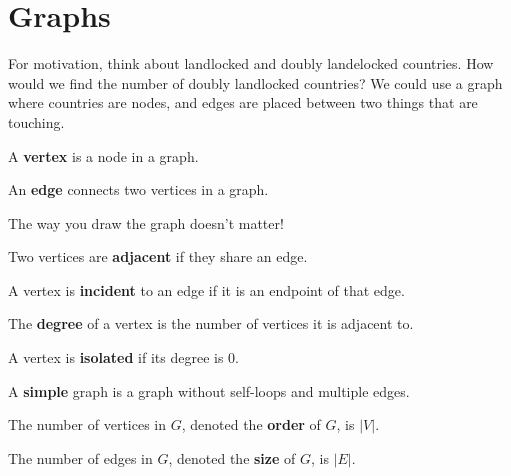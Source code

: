 
\section{Graphs}

For motivation, think about landlocked and doubly landelocked countries. How would we find the number of doubly landlocked countries? We could use a graph where countries are nodes, and edges are placed between two things that are touching.

\begin{definition}
	A \textbf{vertex} is a node in a graph. 
\end{definition}

\begin{definition}
	An \textbf{edge} connects two vertices in a graph.
\end{definition}

\begin{note}
	The way you draw the graph doesn't matter!
\end{note}

\begin{definition}
	Two vertices are \textbf{adjacent} if they share an edge.
\end{definition}

\begin{definition}
	A vertex is \textbf{incident} to an edge if it is an endpoint of that edge.
\end{definition}

\begin{definition}
	The \textbf{degree} of a vertex is the number of vertices it is adjacent to.
\end{definition}

\begin{definition}
	A vertex is \textbf{isolated} if its degree is 0.
\end{definition}

\begin{definition}
	A \textbf{simple} graph is a graph without self-loops and multiple edges.
\end{definition}

\begin{definition}
	The number of vertices in \( G \), denoted the \textbf{order} of \( G \), is \( |V| \).
\end{definition}

\begin{definition}
	The number of edges in \( G \), denoted the \textbf{size} of \( G \), is \( |E| \).
\end{definition}

